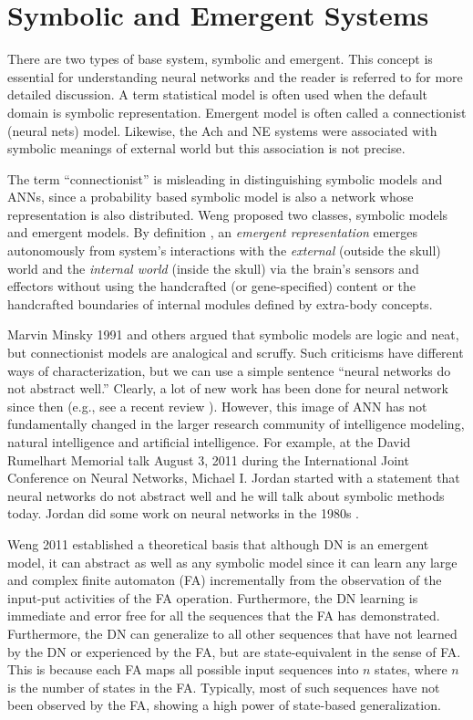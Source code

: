 \documentclass[conference]{IEEEtran}
\begin{document}
\section{Symbolic and Emergent Systems}

There are two types of base system, symbolic and emergent.   This concept is essential for understanding neural networks and the reader is referred to \cite{WengRepRev12} for more detailed discussion. 
A term statistical model is often used when the default domain is symbolic representation.  Emergent
model is often called a connectionist (neural nets) model.  Likewise, the Ach and NE systems were associated with symbolic meanings of external world but this association is not precise.  

The term ``connectionist'' is misleading in distinguishing 
symbolic models and ANNs, since a probability based symbolic model is also a network whose representation is also distributed.  Weng \cite{WengRepRev12} proposed two classes, symbolic models and emergent models.  
By definition \cite{WengRepRev12}, an {\em emergent representation} emerges autonomously from system's  interactions with the {\em external} (outside the skull) world and
the {\em internal world} (inside the skull) via the brain's sensors and
effectors without using the handcrafted (or gene-specified) content or the handcrafted 
boundaries of internal modules defined by extra-body concepts.

Marvin Minsky 1991 \cite{Minsky91} and others argued that symbolic models are logic and neat, but 
 connectionist models are analogical and scruffy.   Such criticisms have different ways of characterization, but
 we can use a simple sentence ``neural networks do not abstract well.''  Clearly, a lot of new work has been
 done for neural network since then (e.g., see a recent review \cite{WengRepRev12}).   However, this image of ANN has not fundamentally changed in the larger research community of intelligence modeling, natural intelligence
 and artificial intelligence.  For example, at the David Rumelhart Memorial talk August 3, 2011 during the International Joint Conference on Neural Networks, Michael I. Jordan started with a statement that neural networks do not abstract well and he will talk about symbolic methods today.  Jordan did some work on neural networks in the 1980s  \cite{Jordan86}. 
 
Weng 2011 \cite{WengWhy11} established a theoretical basis that although DN is an emergent model,
it can abstract as well as any symbolic model since it can learn any large and complex finite
automaton (FA) incrementally from the observation of  the input-put activities of the FA operation.
Furthermore, the DN learning is immediate and error free for all the sequences that the FA has demonstrated.
Furthermore, the DN can generalize to all other sequences that have not learned by the DN or experienced by
the FA, but are state-equivalent in the sense of FA.   This is because each FA maps all possible 
input sequences into $n$ states, where $n$ is the number of states in the FA.  Typically, most of
such sequences have not been observed by the FA, showing a high power of state-based generalization. 
  
\end{document}
